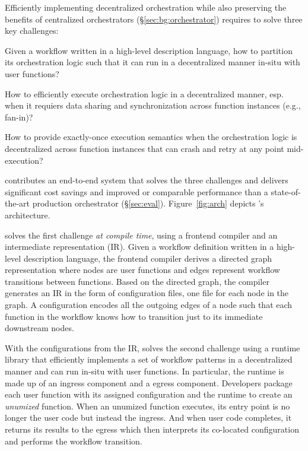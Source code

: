 Efficiently implementing decentralized orchestration while also preserving the
benefits of centralized orchestrators (\S\ref{sec:bg:orchestrator}) requires
\name{} to solve three key challenges:

\squishenum
	\item Given a workflow written in a high-level description language, how
	to partition its orchestration logic such that it can run in a
	decentralized manner in-situ with user functions?

	\item How to efficiently execute orchestration logic in a
	decentralized manner, esp. when it requiers data sharing and
	synchronization across function instances (e.g., fan-in)?

	\item How to provide exactly-once execution semantics when the
	orchestration logic is decentralized across function instances that can
	crash and retry at any point mid-execution?
\squishenumend

\name{} contributes an end-to-end system that solves the three challenges and
delivers significant cost savings and improved or comparable performance than
a state-of-the-art production orchestrator (\S\ref{sec:eval}).
Figure~\ref{fig:arch} depicts \name{}'s architecture.  

\name{} solves the first challenge \emph{at compile time}, using a frontend
compiler and an intermediate representation (IR). Given a workflow definition
written in a high-level description language, the frontend compiler derives a
directed graph representation where nodes are user functions and edges
represent workflow transitions between functions. Based on the directed graph,
the compiler generates an IR in the form of configuration files, one file for
each node in the graph. A \name{} configuration encodes all the outgoing edges
of a node such that each function in the workflow knows how to transition just
to its immediate downstream nodes.

With the configurations from the IR, \name{} solves the second challenge using
a runtime library that efficiently implements a set of workflow patterns in a
decentralized manner and can run in-situ with user functions. In particular,
the \name{} runtime is made up of an ingress component and a egress component.
Developers package each user function with its assigned \name{} configuration
and the \name{} runtime to create an \emph{unumized} function. When an
unumized function executes, its entry point is no longer the user code but
instead the \name{} ingress. And when user code completes, it returns its
results to the \name{} egress which then interprets its co-located \name{}
configuration and performs the workflow transition.

